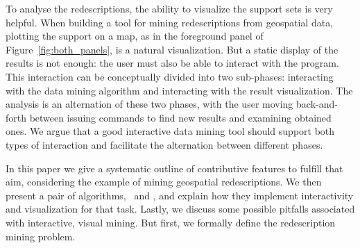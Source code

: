 To analyse the redescriptions, the ability to visualize the support
sets is very helpful. When building a tool for mining redescriptions
from geospatial data, plotting the support on a map, as in the foreground panel of
Figure~\ref{fig:both_panels}, is a natural
visualization. But a static display of the results is not enough: the
user must also be able to interact with the program. This interaction
can be conceptually divided into two sub-phases: interacting with the
data mining algorithm and interacting with the result
visualization. The analysis is an alternation of these two phases,
with the user moving back-and-forth between issuing commands to find
new results and examining obtained ones. We argue that a good
interactive data mining tool should support both types of interaction
and facilitate the alternation between different phases.  

In this paper we give a systematic outline of contributive features to
fulfill that aim, considering the example of mining geospatial
redescriptions. We then present a pair of algorithms, \ReReMi\ and
\Siren, and explain how they implement interactivity and visualization
for that task. Lastly, we discuss some possible pitfalls associated
with interactive, visual mining. But first, we formally define the
redescription mining problem.

